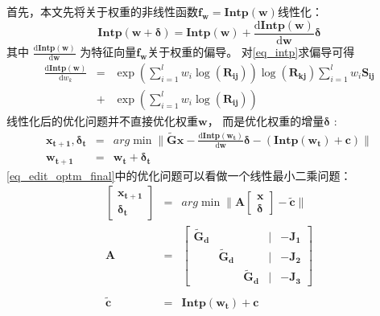 首先，本文先将关于权重的非线性函数$\bm{f_w}=\bm{Intp}(\bm{w})$线性化：
\begin{equation}
    \bm{Intp}(\bm{w}+\bm{\delta})
    =
        \bm{Intp}(\bm{w})
        +
        \frac
            {\mathrm{d} \bm{Intp}(\bm{w})}
            {\mathrm{d} \bm{w}} 
        \bm{\delta}
\end{equation}
其中
$
\frac
    {\mathrm{d} \bm{Intp}(\bm{w})}
    {\mathrm{d} \bm{w}} 
$
为特征向量$\bm{f_w}$关于权重的偏导。
对\ref{eq_intp}求偏导可得
\begin{eqnarray}
    \frac
        {\mathrm{d} \bm{Intp}(\bm{w})}
        {\mathrm{d} w_k}
    &=&
    \exp (\sum_{i=1}^{l}w_i\log(\bm{R_{ij}}))
    \log(\bm{R_{kj}})\sum_{i=1}^{l}w_i\bm{S_{ij}} \nonumber \\
    &+&
    \exp(\sum_{i=1}^{l}w_i\log(\bm{R_{ij}}))
\end{eqnarray}
线性化后的优化问题并不直接优化权重$\bm{w}$，
而是优化权重的增量$\bm{\delta}$
:
\begin{eqnarray}
    \label{eq_edit_optm_final}
    \bm{x_{t+1}},\bm{\delta_t}
    &=&
    arg \min
    \|
    \widetilde{\bm{G}}\bm{x}
        -
        \frac
            {\mathrm{d} \bm{Intp}(\bm{w_t})}
            {\mathrm{d} \bm{w}} 
        \bm{\delta}
        -
        (
            \bm{Intp}(\bm{w_t})
            +
            \bm{c}
        )
    \|
    \nonumber \\
    \bm{w_{t+1}}
    &=&
    \bm{w_t}+\bm{\delta_t}
\end{eqnarray}
\ref{eq_edit_optm_final}中的优化问题可以看做一个线性最小二乘问题：
\begin{eqnarray}
    \label{eq_edit_optm_final}
    \begin{bmatrix}
        \bm{x_{t+1}}\\
        \bm{\delta_t}
    \end{bmatrix}
    &=&
    arg \min
    \|
        \bm{A}
        \begin{bmatrix}
            \bm{x}\\
            \bm{\delta}
        \end{bmatrix}
        -
        \widetilde{\bm{c}}
    \|
    \nonumber \\
    \bm{A}
    &=&
    \begin{bmatrix}
        \bm{\widetilde{G}_d} &        &                     &|&   -\bm{J_1}\\ 
         &       \bm{\widetilde{G}_d} &                     &|&   -\bm{J_2}\\ 
         &       &                  \bm{\widetilde{G}_d}    &|&   -\bm{J_3}
    \end{bmatrix}\\
    \nonumber \\
    \widetilde{\bm{c}}
    &=&
    \bm{Intp}(\bm{w_t})
    +
    \bm{c}\nonumber
\end{eqnarray}
